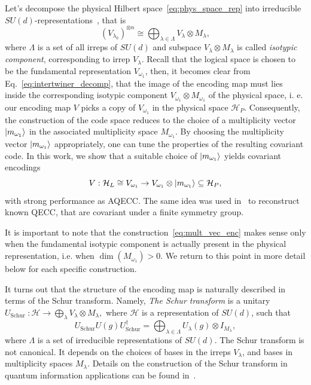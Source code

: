 \documentclass[10pt,twocolumn,superscriptaddress,aps,amsmath,amssymb,citeautoscript,floatfix,prx,longbibliography]{revtex4-2}
\theoremstyle{plain}
\theoremstyle{plain}
\theoremstyle{plain}
\theoremstyle{plain}
\theoremstyle{plain}
\theoremstyle{plain}
\begin{document}
Let's decompose the physical Hilbert space~\eqref{eq:phys_space_rep} into irreducible $SU(d)$-representations~\cite{Kong2022}, that is 
\begin{equation}\label{eq:isotipic_decomp}
    (V_{\lambda_0})^{\otimes n}\cong \bigoplus_{\lambda\in \Lambda}V_{\lambda}\otimes M_{\lambda},
\end{equation}
where $\Lambda$ is a set of all irreps of $SU(d)$ and subspace $V_{\lambda}\otimes M_{\lambda}$ is called \textit{isotypic component}, corresponding to irrep $V_{\lambda}$. Recall that the logical space is chosen to be the fundamental representation $V_{\omega_1}$, then, it becomes clear from Eq.~\eqref{eq:intertwiner_decomp}, that
the image of the encoding map must lies inside the corresponding isotypic component $V_{\omega_1}\otimes M_{\omega_1}$ of the physical space, i. e. our encoding map $V$ picks a copy of $V_{\omega_1}$ in the physical space $\mathcal{H}_P$. Consequently, the construction of the code space reduces to the choice of a multiplicity vector $\ket{m_{\omega_1}}$ in the associated multiplicity space $M_{\omega_1}$. By choosing the multiplicity vector $\ket{m_{\omega_1}}$ appropriately, one can tune the properties of the resulting covariant code. In this work, we show that a suitable choice of $\ket{m_{\omega_1}}$ yields covariant encodings
\begin{equation}\label{eq:mult_vec_enc}
    V: \mathcal{H}_L \cong V_{\omega_1}\rightarrow V_{\omega_1}\otimes \ket{m_{\omega_1}} \subseteq \mathcal{H}_P,
\end{equation}
with strong performance as AQECC. The same idea was used in~\cite{Denys2024} to reconstruct known QECC, that are covariant under a finite symmetry group. 

It is important to note that the construction~\eqref{eq:mult_vec_enc} makes sense only when the fundamental isotypic component is actually present in the physical representation, i.e. when $\operatorname{dim}(M_{\omega_1})>0$. We return to this point in more detail below for each specific construction.

It turns out that the structure of the encoding map is naturally described in terms of the Schur transform. Namely, \textit{The Schur transform} is a unitary
$
    U_{\text {Schur }}: \mathcal{H} \longrightarrow \bigoplus_\lambda V_\lambda \otimes M_\lambda,
$ 
where $\mathcal{H}$ is a representation of $SU(d)$, such that
\begin{equation}\label{eq:schur_transform}
    U_{\text{Schur}} U(g) U_{\text{Schur}}^{\dagger}=\bigoplus_{\lambda\in \Lambda} U_\lambda(g) \otimes I_{M_\lambda},
\end{equation}
where $\Lambda$ is a set of irreducible representations of $SU(d)$.
The Schur transform is not canonical. It depends on the choices of bases in the irreps $V_\lambda$, and bases in multiplicity spaces $M_\lambda$. Details on the construction of the Schur transform in quantum information applications can be found in~\cite{Bacon2006}.
\end{document}
